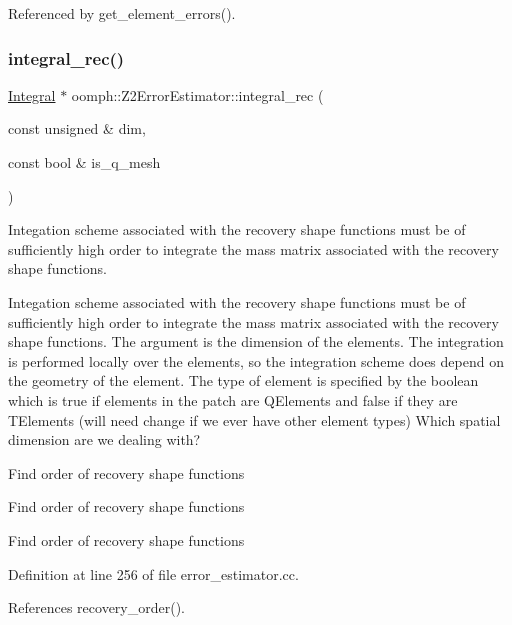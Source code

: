 Referenced by get\+\_\+element\+\_\+errors().

\mbox{\label{classoomph_1_1Z2ErrorEstimator_ac53b6d73d9e73140c92302c2aa70203a}} 
\subsubsection{\texorpdfstring{integral\+\_\+rec()}{integral\_rec()}}
{\footnotesize\ttfamily \hyperlink{classoomph_1_1Integral}{Integral} $\ast$ oomph\+::\+Z2\+Error\+Estimator\+::integral\+\_\+rec (\begin{DoxyParamCaption}\item[{const unsigned \&}]{dim,  }\item[{const bool \&}]{is\+\_\+q\+\_\+mesh }\end{DoxyParamCaption})\hspace{0.3cm}{\ttfamily [private]}}



Integation scheme associated with the recovery shape functions must be of sufficiently high order to integrate the mass matrix associated with the recovery shape functions. 

Integation scheme associated with the recovery shape functions must be of sufficiently high order to integrate the mass matrix associated with the recovery shape functions. The argument is the dimension of the elements. The integration is performed locally over the elements, so the integration scheme does depend on the geometry of the element. The type of element is specified by the boolean which is true if elements in the patch are Q\+Elements and false if they are T\+Elements (will need change if we ever have other element types) Which spatial dimension are we dealing with?

Find order of recovery shape functions

Find order of recovery shape functions

Find order of recovery shape functions 

Definition at line 256 of file error\+\_\+estimator.\+cc.



References recovery\+\_\+order().



